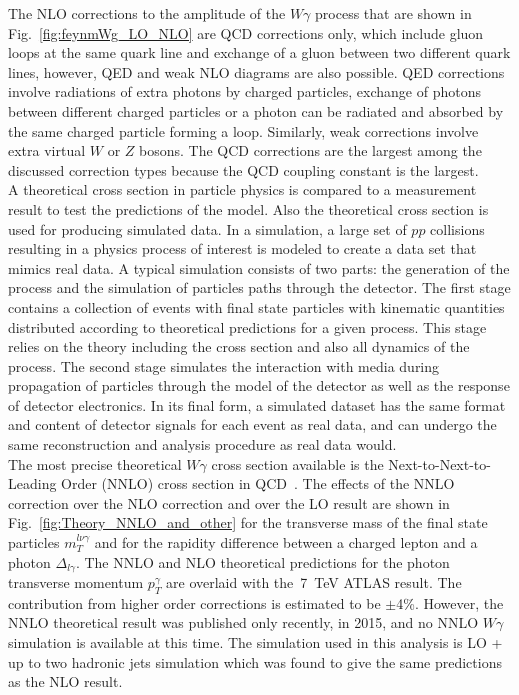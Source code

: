The NLO corrections to the amplitude of the $W\gamma$ process that are shown in Fig.~\ref{fig:feynmWg_LO_NLO} are QCD corrections only, which include gluon loops at the same quark line and exchange of a gluon between two different quark lines, however, QED and weak NLO diagrams are also possible. QED corrections involve radiations of extra photons by charged particles, exchange of photons between different charged particles or a photon can be radiated and absorbed by the same charged particle forming a loop. Similarly, weak corrections involve extra virtual $W$ or $Z$ bosons. The QCD corrections are the largest among the discussed correction types because the QCD coupling constant is the largest.\\

A theoretical cross section in particle physics is compared to a measurement result to test the predictions of the model. Also the theoretical cross section is used for producing simulated data. In a simulation, a large set of $pp$ collisions resulting in a physics process of interest is modeled to create a data set that mimics real data. A typical simulation consists of two parts: the generation of the process and the simulation of particles paths through the detector. The first stage contains a collection of events with final state particles with kinematic quantities distributed according to theoretical predictions for a given process. This stage relies on the theory including the cross section and also all dynamics of the process. The second stage simulates the interaction with media during propagation of particles through the model of the detector as well as the response of detector electronics. In its final form, a simulated dataset has the same format and content of detector signals for each event as real data, and can undergo the same reconstruction and analysis procedure as real data would.\\

The most precise theoretical $W\gamma$ cross section available is the Next-to-Next-to-Leading Order (NNLO) cross section in QCD~\cite{ref_theory_NNLO}. The effects of the NNLO correction over the NLO correction and over the LO result are shown in Fig.~\ref{fig:Theory_NNLO_and_other} for the transverse mass of the final state particles $m_T^{l \nu \gamma}$ and for the rapidity difference between a charged lepton and a photon $\Delta_{l\gamma}$. The NNLO and NLO theoretical predictions for the photon transverse momentum $p_T^\gamma$ are overlaid with the~7~TeV ATLAS result. The contribution from higher order corrections is estimated to be $\pm$4\%. However, the NNLO theoretical result was published only recently, in 2015, and no NNLO $W\gamma$ simulation is available at this time. The simulation used in this analysis is LO + up to two hadronic jets simulation which was found to give the same predictions as the NLO result.\\

